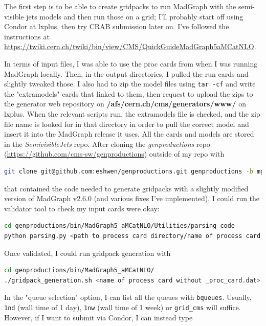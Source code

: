 The first step is to be able to create gridpacks to run MadGraph with the semi-visible jets models and then run those on a grid; I'll probably start off using Condor at lxplus, then try CRAB submission later on. I've followed the instructions at \url{https://twiki.cern.ch/twiki/bin/view/CMS/QuickGuideMadGraph5aMCatNLO}.

In terms of input files, I was able to use the proc cards from when I was running MadGraph locally. Then, in the output directories, I pulled the run cards and slightly tweaked those. I also had to zip the model files using \texttt{tar -cf} and write the "extramodels" cards that linked to them, then request to upload the zips to the generator web repository on \textbf{/afs/cern.ch/cms/generators/www/} on lxplus. When the relevant scripts run, the extramodels file is checked, and the zip file name is looked for in that directory in order to pull the correct model and insert it into the MadGraph release it uses. All the cards and models are stored in the \emph{SemivisibleJets} repo. After cloning the \emph{genproductions} repo (\url{https://github.com/cms-sw/genproductions}) outside of my repo with

\begin{lstlisting}[belowskip=-0.7cm, language=sh, numbers=none]
git clone git@github.com:eshwen/genproductions.git genproductions -b mg26x
\end{lstlisting}

that contained the code needed to generate gridpacks with a slightly modified version of MadGraph v2.6.0 (and various fixes I've implemented), I could run the validator tool to check my input cards were okay:

\begin{lstlisting}[belowskip=-0.7cm, language=sh, numbers=none]
cd genproductions/bin/MadGraph5_aMCatNLO/Utilities/parsing_code
python parsing.py <path to process card directory/name of process card without _proc_card.dat>
\end{lstlisting}

Once validated, I could run gridpack generation with

\begin{lstlisting}[belowskip=-0.7cm, language=sh, numbers=none]
cd genproductions/bin/MadGraph5_aMCatNLO/
./gridpack_generation.sh <name of process card without _proc_card.dat> <relative path to cards directory> <queue selection>
\end{lstlisting}

In the "queue selection" option, I can list all the queues with \texttt{bqueues}. Usually, \texttt{1nd} (wall time of 1 day), \texttt{1nw} (wall time of 1 week) or \texttt{grid\_cms} will suffice. However, if I want to submit via Condor, I can instead type

